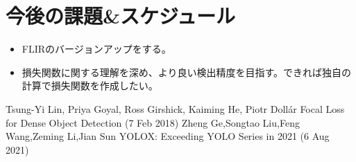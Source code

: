 \documentclass[a4j]{jarticle}
\begin{document}
	\section{今後の課題\&スケジュール}
		\begin{itemize}
			\item FLIRのバージョンアップをする。
			\item 損失関数に関する理解を深め、より良い検出精度を目指す。できれば独自の計算で損失関数を作成したい。
		\end{itemize}

\begin{thebibliography}{10}
	Tsung-Yi Lin, Priya Goyal, Ross Girshick, Kaiming He, Piotr Dollár Focal Loss for Dense Object Detection (7 Feb 2018)
	Zheng Ge,Songtao Liu,Feng Wang,Zeming Li,Jian Sun YOLOX: Exceeding YOLO Series in 2021 (6 Aug 2021)
\end{thebibliography}
\end{document}
